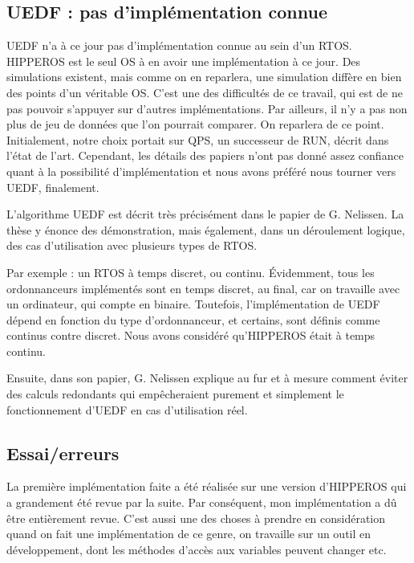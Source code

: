 	
	\subsection{UEDF : pas d'implémentation connue}
	UEDF n'a à ce jour pas d'implémentation connue au sein d'un RTOS. HIPPEROS est le seul OS à en 
	avoir une implémentation à ce jour. Des simulations existent, mais comme on en reparlera, une simulation diffère 
	en bien des points d'un véritable OS. C'est une des difficultés de ce travail, qui est de ne pas pouvoir 
	s'appuyer sur d'autres implémentations. Par ailleurs, il n'y a pas non plus de jeu de données que l'on 
	pourrait comparer. On reparlera de ce point. Initialement, notre choix portait sur QPS, un 
	successeur de RUN, décrit dans l'état de l'art. Cependant, les détails des papiers n'ont pas donné 
	assez confiance quant à la possibilité d'implémentation et nous avons préféré nous tourner vers UEDF, finalement.
	
	
	L'algorithme UEDF est décrit très précisément dans le papier de G. Nelissen. La thèse y énonce 
	des démonstration, mais également, dans un déroulement logique, des cas d'utilisation avec 
	plusieurs types de RTOS. 
	
	Par exemple : un RTOS à temps discret, ou continu. 
	Évidemment, tous les ordonnanceurs implémentés sont en temps discret, au final, car on travaille avec 
	un ordinateur, qui compte en binaire. Toutefois, l'implémentation de UEDF dépend en fonction du type 
	d'ordonnanceur, et certains,  sont définis comme continus 
	contre discret. Nous avons considéré qu'HIPPEROS était à temps continu.
	
	Ensuite, dans son papier, G. Nelissen explique au fur et à mesure comment éviter des calculs 
	redondants qui empêcheraient purement et simplement le fonctionnement d'UEDF en cas d'utilisation réel.
	
	
	
	\subsection{Essai/erreurs}
	La première implémentation faite a été réalisée sur une version d'HIPPEROS qui a grandement été revue par la suite. Par conséquent, mon implémentation a dû être entièrement revue. C'est aussi une des choses à prendre en
	 considération quand on fait une implémentation de ce genre, on travaille sur un outil en développement, 
	 dont les méthodes d'accès aux variables peuvent changer etc.
	 

